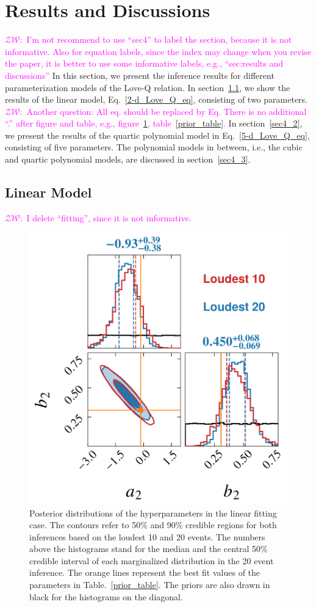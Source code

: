 \documentclass[a4paper,11pt]{article}
\newcommand{\ZW}[1]{\textcolor{magenta}{$\mathcal{ZW}$:~#1}}
\begin{document}
\section{Results and Discussions}
\label{sec4}
\ZW{I'm not recommend to use ``sec4'' to label the section, because it is not
informative. Also for equation labels, since the index may change when you revise
the paper, it is better to use some informative labels, e.g., ``sec:results and discussions''}
In this section, we present the inference results for different parameterization
models of the Love-Q relation. 
In section~\ref{sec4_1}, we show the results of the linear model,
Eq.~\eqref{2-d_Love_Q_eq}, consisting of two parameters.\ZW{Another question: All eq. should be replaced by Eq. There is
no additional ``.'' after figure and table, e.g., figure~\ref{corner2-d}, table~\ref{prior_table}.}
In section~\ref{sec4_2}, we present the results of the quartic polynomial model
in Eq.~\eqref{5-d_Love_Q_eq}, consisting of five parameters.
The polynomial models in between, i.e., the cubic and quartic polynomial models,
are discussed in section~\ref{sec4_3}.
\subsection{Linear Model}
\label{sec4_1}
\ZW{I delete ``fitting'', since it is not informative.}
\begin{figure}
    \centering
    \includegraphics[width=0.5\linewidth]{comparison_corner_plot.pdf}
    \caption{Posterior distributions of the hyperparameters in the linear fitting case. The contours refer to 50\% and 90\% credible regions for both inferences based on the loudest 10 and 20 events. The numbers above the histograms stand for the median and the central 50\% credible interval of each marginalized distribution in the 20 event inference. The orange lines represent the best fit values of the parameters in Table.~\ref{prior_table}. The priors are also drawn in black for the histograms on the diagonal.}
    \label{corner2-d}
\end{figure}
\end{document}
